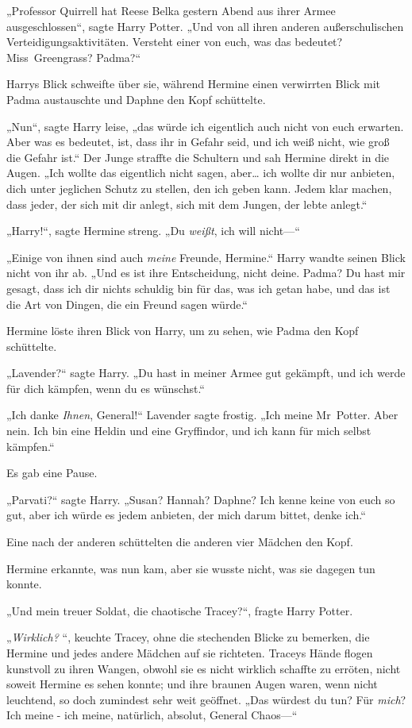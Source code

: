 {„Professor Quirrell hat Reese Belka gestern Abend aus ihrer Armee ausgeschlossen“, sagte Harry Potter. „Und von all ihren anderen außerschulischen Verteidigungsaktivitäten. Versteht einer von euch, was das bedeutet? Miss~Greengrass? Padma?“

Harrys Blick schweifte über sie, während Hermine einen verwirrten Blick mit Padma austauschte und Daphne den Kopf schüttelte.

„Nun“, sagte Harry leise, „das würde ich eigentlich auch nicht von euch erwarten. Aber was es bedeutet, ist, dass ihr in Gefahr seid, und ich weiß nicht, wie groß die Gefahr ist.“ Der Junge straffte die Schultern und sah Hermine direkt in die Augen. „Ich wollte das eigentlich nicht sagen, aber… ich wollte dir nur anbieten, dich unter jeglichen Schutz zu stellen, den ich geben kann. Jedem klar machen, dass jeder, der sich mit dir anlegt, sich mit dem Jungen, der lebte anlegt.“

„Harry!“, sagte Hermine streng. „Du \emph{weißt}, ich will nicht—“

„Einige von ihnen sind auch \emph{meine} Freunde, Hermine.“ Harry wandte seinen Blick nicht von ihr ab. „Und es ist ihre Entscheidung, nicht deine. Padma? Du hast mir gesagt, dass ich dir nichts schuldig bin für das, was ich getan habe, und das ist die Art von Dingen, die ein Freund sagen würde.“

Hermine löste ihren Blick von Harry, um zu sehen, wie Padma den Kopf schüttelte.

„Lavender?“ sagte Harry. „Du hast in meiner Armee gut gekämpft, und ich werde für dich kämpfen, wenn du es wünschst.“

„Ich danke \emph{Ihnen}, General!“ Lavender sagte frostig. „Ich meine Mr~Potter. Aber nein. Ich bin eine Heldin und eine Gryffindor, und ich kann für mich selbst kämpfen.“

Es gab eine Pause.

„Parvati?“ sagte Harry. „Susan? Hannah? Daphne? Ich kenne keine von euch so gut, aber ich würde es jedem anbieten, der mich darum bittet, denke ich.“

Eine nach der anderen schüttelten die anderen vier Mädchen den Kopf.

Hermine erkannte, was nun kam, aber sie wusste nicht, was sie dagegen tun konnte.

„Und mein treuer Soldat, die chaotische Tracey?“, fragte Harry Potter.

„\emph{Wirklich?} “, keuchte Tracey, ohne die stechenden Blicke zu bemerken, die Hermine und jedes andere Mädchen auf sie richteten. Traceys Hände flogen kunstvoll zu ihren Wangen, obwohl sie es nicht wirklich schaffte zu erröten, nicht soweit Hermine es sehen konnte; und ihre braunen Augen waren, wenn nicht leuchtend, so doch zumindest sehr weit geöffnet. „Das würdest du tun? Für \emph{mich}? Ich meine - ich meine, natürlich, absolut, General Chaos—“

}
